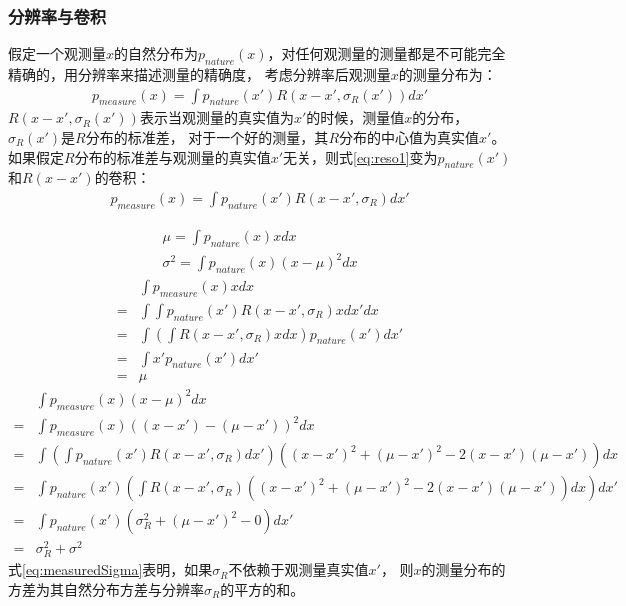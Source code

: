 \subsubsection{分辨率与卷积}

假定一个观测量$x$的自然分布为$p_{nature}(x)$，对任何观测量的测量都是不可能完全精确的，用分辨率来描述测量的精确度，
考虑分辨率后观测量$x$的测量分布为：
\begin{gather}
    \label{eq:reso1}
    p_{measure}(x)=\int p_{nature}(x')R(x-x',\sigma_{R}(x'))dx'
\end{gather}
$R(x-x',\sigma_{R}(x'))$表示当观测量的真实值为$x'$的时候，测量值$x$的分布，
$\sigma_{R}(x')$是$R$分布的标准差，
对于一个好的测量，其$R$分布的中心值为真实值$x'$。
如果假定$R$分布的标准差与观测量的真实值$x'$无关，则式\ref{eq:reso1}变为$p_{nature}(x')$和$R(x-x')$的卷积：
\begin{gather}
    p_{measure}(x)=\int p_{nature}(x')R(x-x',\sigma_{R})dx'
\end{gather}

\begin{gather}
    \mu=\int p_{nature}(x)xdx\\
    \sigma^{2} = \int p_{nature}(x)(x-\mu)^{2}dx
\end{gather}
\begin{align}
    &\int p_{measure}(x)xdx\\
    =&\int \int p_{nature}(x')R(x-x',\sigma_{R}) x dx'dx\\
    =&\int (\int R(x-x',\sigma_{R}) xdx)p_{nature}(x') dx'\\
    =&\int x'p_{nature}(x') dx'\\
    =&\mu
\end{align}
\begin{align}
    &\int p_{measure}(x)(x-\mu)^{2}dx\\
    =&\int p_{measure}(x)((x-x')-(\mu-x'))^{2}dx\\
    =&\int (\int p_{nature}(x')R(x-x',\sigma_{R})dx')((x-x')^{2}+(\mu-x')^{2}-2(x-x')(\mu-x'))dx\\
    =&\int p_{nature}(x') (\int R(x-x',\sigma_{R})((x-x')^{2}+(\mu-x')^{2}-2(x-x')(\mu-x'))dx)dx'\\
    =&\int p_{nature}(x') (\sigma_{R}^{2}+(\mu-x')^{2}-0)dx'\\
    =&\sigma_{R}^{2}+\sigma^{2}
    \label{eq:measuredSigma}
\end{align}
式\ref{eq:measuredSigma}表明，如果$\sigma_{R}$不依赖于观测量真实值$x'$，
则$x$的测量分布的方差为其自然分布方差与分辨率$\sigma_{R}$的平方的和。

